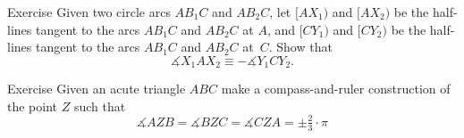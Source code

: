\begin{thm}{Exercise}\label{ex:two-arcs}
Given two circle arcs $AB_1C$ and $AB_2C$,
let $[AX_1)$ and $[AX_2)$ be the half-lines tangent to the arcs $AB_1C$ and $AB_2C$ at $A$,
and 
$[CY_1)$ and $[CY_2)$ be the half-lines tangent to the arcs $AB_1C$ and $AB_2C$ at~$C$.
Show that
$$\measuredangle X_1AX_2\equiv -\measuredangle Y_1CY_2.$$

\end{thm}





\begin{thm}{Exercise}\label{ex:3x120}
Given an acute triangle $ABC$
make a compass-and-ruler construction of the point $Z$ such that
\[\measuredangle AZB
= \measuredangle BZC
= \measuredangle CZA
=\pm\tfrac23\cdot\pi\]

\end{thm}


